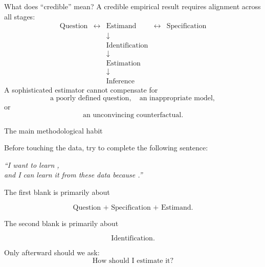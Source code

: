 \documentclass[aspectratio=169,11pt]{beamer}
\begin{document}
\begin{frame}{What does ``credible'' mean?}
A credible empirical result requires alignment across all stages:
\[
\boxed{
\begin{array}{ccccc}
\text{Question}
&
\longleftrightarrow
&
\text{Estimand}
&
\longleftrightarrow
&
\text{Specification}
\\
&&\downarrow&&\\
&&\text{Identification}&&\\
&&\downarrow&&\\
&&\text{Estimation}&&\\
&&\downarrow&&\\
&&\text{Inference}&&
\end{array}
}
\]
A sophisticated estimator cannot compensate for
\[
\text{a poorly defined question},
\quad
\text{an inappropriate model},
\]
or
\[
\text{an unconvincing counterfactual}.
\]
\end{frame}

\begin{frame}{The main methodological habit}

Before touching the data, try to complete the following sentence:

\vspace{0.4em}

\begin{center}
\Large
\textit{``I want to learn \underline{\hspace{3cm}},
\\[0.4em]
and I can learn it from these data because
\underline{\hspace{3cm}}.''}
\end{center}

\vspace{0.5em}

The first blank is primarily about

\[
\boxed{\text{Question + Specification + Estimand}.}
\]

The second blank is primarily about

\[
\boxed{\text{Identification}.}
\]

\vspace{0.35em}

Only afterward should we ask:
\[
\boxed{\text{How should I estimate it?}}
\]

\end{frame}
\end{document}
